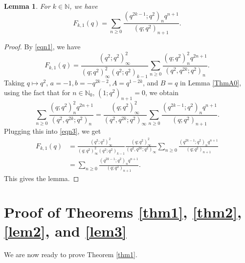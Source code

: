 \documentclass[12pt,reqno]{amsart}
\newcommand{\N}{\mathbb{N}}
\renewcommand{\(}{\left\(}
\renewcommand{\)}{\right\)}
\numberwithin{equation}{section}
\theoremstyle{plain}
\newtheorem{lemma}[theorem]{Lemma}
\theoremstyle{definition}
\numberwithin{equation}{section}
\begin{document}
\begin{lemma}\label{lem1}
	For $k\in \mathbb{N}$, we have
	\[
	F_{k,1}(q)=\sum_{n\ge 0}\frac{\left(q^{2k-1};q^2\right)_nq^{n+1}}{\left(q;q^2\right)_{n+1}}.
	\]	
\end{lemma}
\begin{proof}
	By \eqref{eqn1}, we have
	\begin{equation}\label{eqn3}
	F_{k,1}(q)=\frac{\left(q^2;q^2\right)^2_{\infty}}{(q;q^2)^2_{\infty}\left(q^2;q^2\right)_{k-1}}\sum_{n\ge 0}\frac{\left(q;q^2\right)^2_nq^{2n+1}}{\left(q^2,q^{2k};q^2\right)_n}.
	\end{equation}
	Taking $q\mapsto q^2$, $a=-1, b=-q^{2k-2}, A=q^{1-2k}$, and $B=q$ in Lemma \ref{ThmA0}, using the fact that for $n\in\N_0$, $(1;q^2)_{n+1}=0$, we obtain
	\[
	\sum_{n\ge 0}\frac{\left(q;q^2\right)^2_nq^{2n+1}}{\left(q^2,q^{2k};q^2\right)_n}=\frac{(q;q^2)^2_{\infty}}{\left(q^2,q^{2k};q^2\right)_{\infty}}\sum_{n\ge 0}\frac{\left(q^{2k-1};q^2\right)_n q^{n+1}}{\left(q;q^2\right)_{n+1}}.
	\] 
	Plugging this into \eqref{eqn3}, we get
	\begin{align*}
	F_{k,1}(q)&=\frac{\left(q^2;q^2\right)^2_{\infty}}{\left(q;q^2\right)^2_{\infty}\left(q^2;q^2\right)_{k-1}}\frac{(q;q^2)^2_{\infty}}{\left(q^2,q^{2k};q^2\right)_{\infty}}\sum_{n\ge 0}\frac{\left(q^{2k-1};q^2\right)_n q^{n+1}}{\left(q;q^2\right)_{n+1}}\\&=\sum_{n\ge 0}\frac{\left(q^{2k-1};q^2\right)_n q^{n+1}}{\left(q;q^2\right)_{n+1}}.
	\end{align*}
	This gives the lemma.
\end{proof}














\section{Proof of Theorems \ref{thm1}, \ref{thm2}, \ref{lem2}, and \ref{lem3}}\label{mainresults}
We are now ready to prove Theorem \ref{thm1}.
\end{document}
